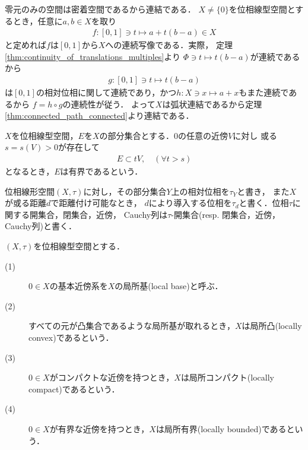 	\begin{prf}
		零元のみの空間は密着空間であるから連結である．
		$X \neq \{0\}$を位相線型空間とするとき，任意に$a,b \in X$を取り
		\begin{align}
			f:[0,1] \ni t \longmapsto a + t(b - a) \in X
		\end{align}
		と定めれば$f$は$[0,1]$から$X$への連続写像である．実際，
		定理\ref{thm:continuity_of_translations_multiples}より
		$\Phi \ni t \longmapsto t(b-a)$が連続であるから
		\begin{align}
			g:[0,1] \ni t \longmapsto t(b-a)
		\end{align}
		は$[0,1]$の相対位相に関して連続であり，かつ$h:X \ni x \longmapsto a + x$もまた連続であるから
		$f = h \circ g$の連続性が従う．
		よって$X$は弧状連結であるから定理\ref{thm:connected_path_connected}より連結である．
		\QED
	\end{prf}
	
	\begin{screen}
		\begin{dfn}[位相線形空間の有界集合]
			$X$を位相線型空間，$E$を$X$の部分集合とする．0の任意の近傍$V$に対し
			或る$s = s(V) > 0$が存在して
			\begin{align}
				E \subset t V, \quad (\forall t > s)
			\end{align}
			となるとき，$E$は有界であるという．
		\end{dfn}
	\end{screen}
	
	\begin{screen}
		\begin{thm}
		\end{thm}
	\end{screen}
	
	位相線形空間$(X,\tau)$に対し，その部分集合$Y$上の相対位相を$\tau_Y$と書き，
	また$X$が或る距離$d$で距離付け可能なとき，
	$d$により導入する位相を$\tau_d$と書く．位相$\tau$に関する開集合，閉集合，近傍，
	Cauchy列は$\tau$-開集合(resp. 閉集合，近傍，Cauchy列)と書く．
	
	\begin{screen}
		\begin{dfn}
			$(X,\tau)$を位相線型空間とする．
			\begin{description}
				\item[(1)] $0 \in X$の基本近傍系を$X$の局所基(local base)と呼ぶ．
				\item[(2)] すべての元が凸集合であるような局所基が取れるとき，$X$は局所凸(locally convex)であるという．
				\item[(3)] $0 \in X$がコンパクトな近傍を持つとき，$X$は局所コンパクト(locally compact)であるという．
				\item[(4)] $0 \in X$が有界な近傍を持つとき，$X$は局所有界(locally bounded)であるという．
			\end{description}
		\end{dfn}
	\end{screen}
	
